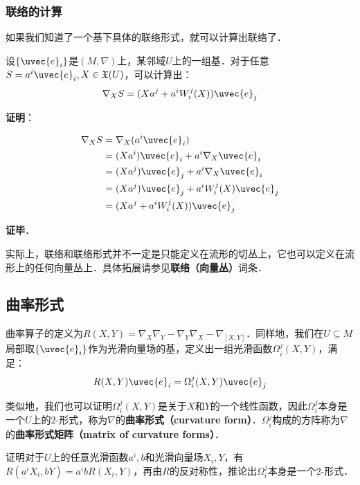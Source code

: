 \subsubsection{联络的计算}

如果我们知道了一个基下具体的联络形式，就可以计算出联络了．

\begin{theorem}{}
设$\{\uvec{e}_i\}$是$(M, \nabla)$上，某邻域$U$上的一组基．对于任意$S=a^i\uvec{e}_i, X\in\mathfrak{X}(U)$，可以计算出：
\begin{equation}
\nabla_XS=(Xa^j+a^iW^j_i(X))\uvec{e}_j
\end{equation}
\end{theorem}

\textbf{证明}：

\begin{equation}
\begin{aligned}
\nabla_XS&=\nabla_X(a^i\uvec{e}_i)\\
&=(Xa^i)\uvec{e}_i+a^i\nabla_X\uvec{e}_i\\
&=(Xa^j)\uvec{e}_j+a^i\nabla_X\uvec{e}_i\\
&=(Xa^j)\uvec{e}_j+a^iW^j_i(X)\uvec{e}_j\\
&=(Xa^j+a^iW^j_i(X))\uvec{e}_j
\end{aligned}
\end{equation}

\textbf{证毕}．

实际上，联络和联络形式并不一定是只能定义在流形的切丛上，它也可以定义在流形上的任何向量丛上．具体拓展请参见\textbf{联络（向量丛）}词条．

\subsection{曲率形式}

曲率算子的定义为$R(X, Y)=\nabla_X\nabla_Y-\nabla_Y\nabla_X-\nabla_{[X, Y]}$．同样地，我们在$U\subseteq M$局部取$\{\uvec{e}_i\}$作为光滑向量场的基，定义出一组光滑函数$\Omega^j_i(X, Y)$，满足：
\begin{equation}
R(X, Y)\uvec{e}_i=\Omega^j_i(X, Y)\uvec{e}_j
\end{equation}

类似地，我们也可以证明$\Omega^j_i(X, Y)$是关于$X$和$Y$的一个线性函数，因此$\Omega^j_i$本身是一个$U$上的$2$-形式，称为$\nabla$的\textbf{曲率形式（curvature form）}．$\Omega^j_i$构成的方阵称为$\nabla$的\textbf{曲率形式矩阵（matrix of curvature forms）}．

\begin{exercise}{}
证明对于$U$上的任意光滑函数$a^i, b$和光滑向量场$X_i, Y$，有$R(a^iX_i, bY)=a^ibR(X_i, Y)$，再由$R$的反对称性，推论出$\Omega^j_i$本身是一个$2$-形式．
\end{exercise}

